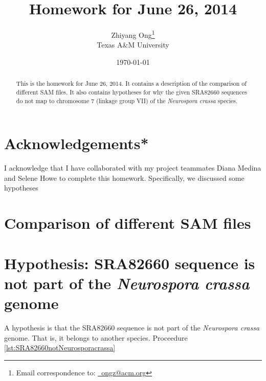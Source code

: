 \documentclass[letter,12pt]{article}
\begin{document}
\title{Homework for June 26, 2014}
\date{\today}
\author{Zhiyang Ong\thanks{Email correspondence to: \href{mailto:ongz@acm.org}{\Email\ ongz@acm.org}}\\
	Texas A\&M University
}
\maketitle


\begin{abstract} 
This is the homework for June 26, 2014. It contains a description of the comparison of different SAM files. It also contains hypotheses for why the given SRA82660 sequences do not map to chromosome 7 (linkage group VII) of the {\it Neurospora crassa} species.
\end{abstract}




\section{Acknowledgements*}
\label{sec:Acknowledgement*}

I acknowledge that I have collaborated with my project teammates Diana Medina and Selene Howe to complete this homework. Specifically, we discussed some hypotheses



\section{Comparison of different SAM files}
\label{sec:ComparisonofDifferentSAMfiles}










\section{Hypothesis: SRA82660 sequence is not part of the {\it Neurospora crassa} genome}
\label{sec:Hypothesis}


A hypothesis is that the SRA82660 sequence is not part of the {\it Neurospora crassa} genome. That is, it belongs to another species. Proceedure \ref{lst:SRA82660notNeurosporacrassa}
\end{document}
